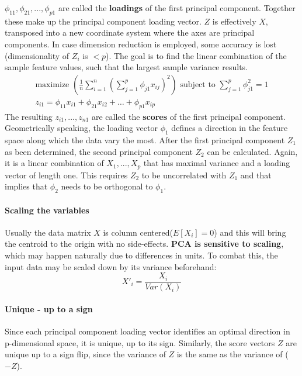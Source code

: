 \documentclass[../document.tex]{subfiles}
\begin{document}
	\(\phi_{11}, \phi_{21},...,\phi_{p1}\) are called the \textbf{loadings} of the first principal component. Together these make up the principal component loading vector. $Z$ is effectively $X$, transposed into a new coordinate system where the axes are principal components. In case dimension reduction is employed, some accuracy is lost (dimensionality of $Z_i$ is $<p$).
	The goal is to find the linear combination of the sample feature values, such that the largest sample variance results.
	\begin{equation}
	\begin{split}
		\text{maximize }(\frac{1}{n}\sum_{i=1}^{n}(\sum_{j=1}^{p}\phi_{j1}x_{ij})^2)\text{ subject to }\sum_{j=1}^{p}\phi_{j1}^2=1\\
		z_{i1}=\phi_{11}x_{i1}+\phi_{21}x_{i2}+\dots+\phi_{p1}x_{ip}
	\end{split}
	\end{equation}
	The resulting \(z_{i1},...,z_{n1}\) are called the \textbf{scores} of the first principal component. Geometrically speaking, the loading vector \(\phi_{1}\) defines a direction in the feature space along which the data vary the most. After the first principal component \(Z_{1}\) as been determined, the second principal component \(Z_{2}\) can be calculated. Again, it is a linear combination of \(X_{1},...,X_{p}\) that has maximal variance and a loading vector of length one. This requires \(Z_{2}\) to be uncorrelated with \(Z_{1}\) and that implies that \(\phi_{2}\) needs to be orthogonal to \(\phi_{1}\).

	\paragraph{Scaling the variables}
	Usually the data matrix $X$ is column centered($E[X_i]=0$) and this will bring the centroid to the origin with no side-effects. \textbf{PCA is sensitive to scaling}, which may happen naturally due to differences in units. To combat this, the input data may be scaled down by its variance beforehand:
	\begin{equation}
		X'_i=\frac{X_i}{Var(X_i)}
	\end{equation}

	\paragraph{Unique - up to a sign}
	Since each principal component loading vector identifies an optimal direction in p-dimensional space, it is unique, up to its sign. Similarly, the score vectors $Z$ are unique up to a sign flip, since the variance of $Z$ is the same as the variance of ($-Z$).
\end{document}
